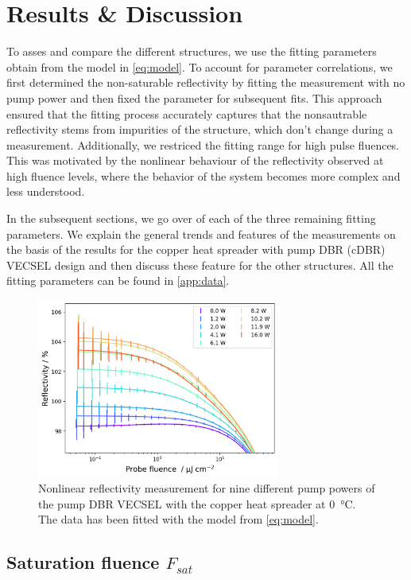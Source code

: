 \chapter{Results \& Discussion}\label{chapter:results}

To asses and compare the different structures, we use the fitting parameters obtain from the model in \cref{eq:model}. To account for parameter correlations, we first determined the non-saturable reflectivity by fitting the measurement with no pump power and then fixed the parameter for subsequent fits. This approach ensured that the fitting process accurately captures that the nonsautrable reflectivity stems from impurities of the structure, which don't change during a measurement. Additionally, we restriced the fitting range for high pulse fluences. This was motivated by the nonlinear behaviour of the reflectivity observed at high fluence levels, where the behavior of the system becomes more complex and less understood.

In the subsequent sections, we go over of each of the three remaining fitting parameters. We explain the general trends and features of the measurements on the basis of the results for the copper heat spreader with pump DBR (cDBR) VECSEL design and then discuss these feature for the other structures. All the fitting parameters can be found in \cref{app:data}.

\begin{figure}[ht]
    \centering
    \includegraphics[width=8cm]{images/sv167-b5.png}
    \caption{Nonlinear reflectivity measurement for nine different pump powers of the pump DBR VECSEL with the copper heat spreader at \qty{0}{\celsius}. The data has been fitted with the model from \cref{eq:model}.}
    \label{fig:gainSV167}
\end{figure}

\section{\texorpdfstring{Saturation fluence $F_{sat}$}{Saturation fluence Fsat}}

